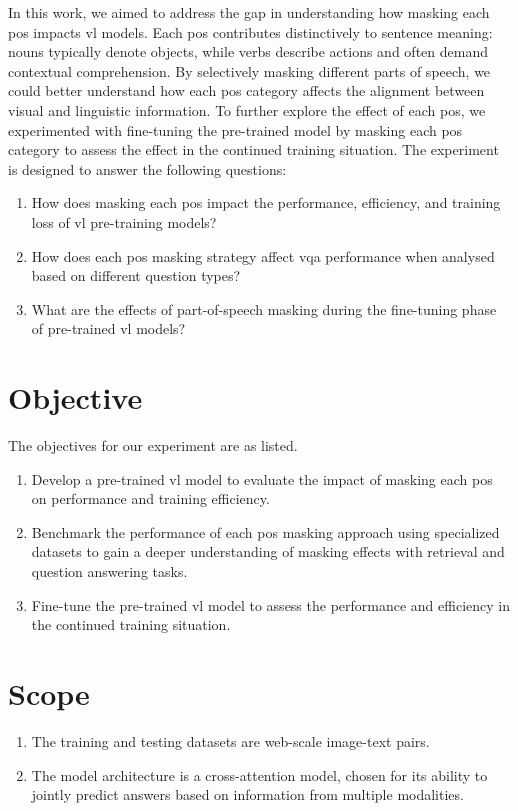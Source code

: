 In this work, we aimed to address the gap in understanding how masking each \acrfull{pos} impacts \acrshort{vl} models.  
Each \acrshort{pos} contributes distinctively to sentence meaning: nouns typically denote objects, while verbs describe actions and often demand contextual comprehension.  
By selectively masking different parts of speech, we could better understand how each \acrshort{pos} category affects the alignment between visual and linguistic information.  
To further explore the effect of each \acrshort{pos}, we experimented with fine-tuning the pre-trained model by masking each \acrshort{pos} category to assess the effect in the continued training situation.  
The experiment is designed to answer the following questions:  
\begin{enumerate}  
    \item How does masking each \acrshort{pos} impact the performance, efficiency, and training loss of \acrshort{vl} pre-training models?  
    \item How does each \acrshort{pos} masking strategy affect \acrfull{vqa} performance when analysed based on different question types?  
    \item What are the effects of part-of-speech masking during the fine-tuning phase of pre-trained \acrshort{vl} models?  
\end{enumerate}  


\section{Objective}  
The objectives for our experiment are as listed.  
\begin{enumerate}  
    \item Develop a pre-trained \acrshort{vl} model to evaluate the impact of masking each \acrshort{pos} on performance and training efficiency.  
    \item Benchmark the performance of each \acrshort{pos} masking approach using specialized datasets to gain a deeper understanding of masking effects with retrieval and question answering tasks.  
    \item Fine-tune the pre-trained \acrshort{vl} model to assess the performance and efficiency in the continued training situation.  
\end{enumerate}  

\section{Scope}
\begin{enumerate}  
    \item The training and testing datasets are web-scale image-text pairs.  
    \item The model architecture is a cross-attention model, chosen for its ability to jointly predict answers based on information from multiple modalities.  
\end{enumerate}  
